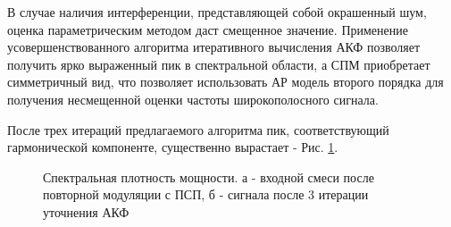В случае наличия интерференции, представляющей собой окрашенный шум, оценка параметрическим методом даст смещенное значение.
Применение усовершенствованного алгоритма итеративного вычисления АКФ позволяет получить ярко выраженный пик в спектральной области,
а СПМ приобретает симметричный вид, что позволяет использовать АР модель второго порядка для получения несмещенной оценки частоты
широкополосного сигнала.

После трех итераций предлагаемого алгоритма пик, соответствующий гармонической компоненте, существенно вырастает - Рис. \ref{pic:GPS_spectrum_iter3}.
\begin{figure}[h]
	\center{}
	\caption{Спектральная плотность мощности. а - входной смеси после повторной модуляции с ПСП, б - сигнала после 3 итерации уточнения АКФ}
	\label{pic:GPS_spectrum_iter3}
\end{figure}

